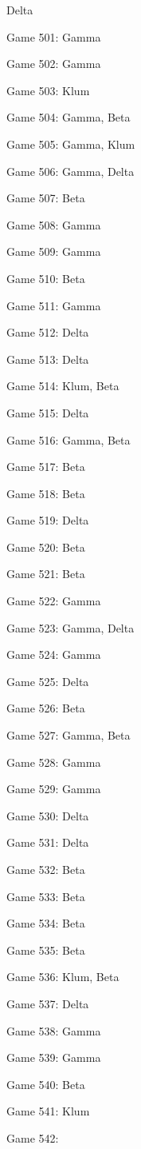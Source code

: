 \documentclass{article}
\begin{document}
\begin{multicols}{3}
\begin{compactitem}
Delta
\item Game 501:
Gamma
\item Game 502:
Gamma
\item Game 503:
Klum
\item Game 504:
Gamma, Beta
\item Game 505:
Gamma, Klum
\item Game 506:
Gamma, Delta
\item Game 507:
Beta
\item Game 508:
Gamma
\item Game 509:
Gamma
\item Game 510:
Beta
\item Game 511:
Gamma
\item Game 512:
Delta
\item Game 513:
Delta
\item Game 514:
Klum, Beta
\item Game 515:
Delta
\item Game 516:
Gamma, Beta
\item Game 517:
Beta
\item Game 518:
Beta
\item Game 519:
Delta
\item Game 520:
Beta
\item Game 521:
Beta
\item Game 522:
Gamma
\item Game 523:
Gamma, Delta
\item Game 524:
Gamma
\item Game 525:
Delta
\item Game 526:
Beta
\item Game 527:
Gamma, Beta
\item Game 528:
Gamma
\item Game 529:
Gamma
\item Game 530:
Delta
\item Game 531:
Delta
\item Game 532:
Beta
\item Game 533:
Beta
\item Game 534:
Beta
\item Game 535:
Beta
\item Game 536:
Klum, Beta
\item Game 537:
Delta
\item Game 538:
Gamma
\item Game 539:
Gamma
\item Game 540:
Beta
\item Game 541:
Klum
\item Game 542:

\end{compactitem}
\end{multicols}
\end{document}
